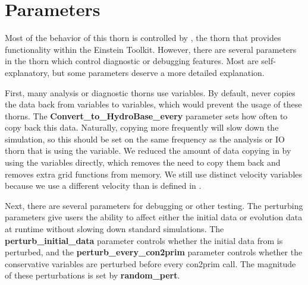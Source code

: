 \documentclass{article}
\begin{document}
\section{Parameters}

Most of the behavior of this thorn is controlled by \glib,
the thorn that provides \grhayl{} functionality
within the Einstein Toolkit. However, there are several
parameters in the thorn which control diagnostic or debugging
features. Most are self-explanatory, but some parameters deserve
a more detailed explanation.

First, many analysis or diagnostic thorns use \hydrobase{} variables.
By default, \ghd{} never copies the data back from \ghd{} variables
to \hydrobase{} variables, which would prevent the usage of these
thorns. The \textbf{Convert\_to\_HydroBase\_every} parameter
sets how often to copy back this data. Naturally, copying more
frequently will slow down the simulation, so this should be set
on the same frequency as the analysis or IO thorn that is using
the \hydrobase{} variable. We reduced the amount of data copying in \ghd{}
by using the \hydrobase{} variables directly, which removes the need
to copy them back and removes extra grid functions from memory.
We still use distinct velocity variables because we use a different
velocity than is defined in \hydrobase.

Next, there are several parameters for debugging or other testing.
The perturbing parameters give users the ability to affect either
the initial data or evolution data at runtime without slowing down
standard simulations. The \textbf{perturb\_initial\_data} parameter
controls whether the initial data from \hydrobase{} is perturbed, and
the \textbf{perturb\_every\_con2prim} parameter controls whether
the conservative variables are perturbed before every con2prim call.
The magnitude of these perturbations is set by \textbf{random\_pert}.

\end{document}
